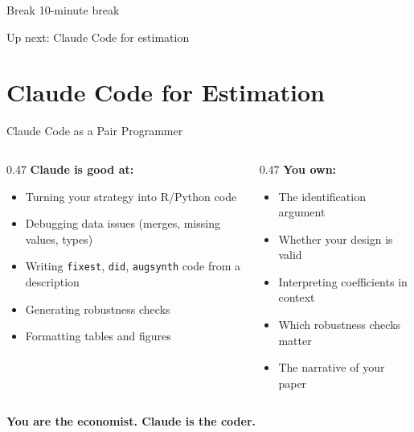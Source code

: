 
\begin{frame}{Break}
  \centering
  \vspace{2cm}
  {\Large 10-minute break}

  \vspace{1cm}

  Up next: Claude Code for estimation
\end{frame}


\section{Claude Code for Estimation}

\begin{frame}{Claude Code as a Pair Programmer}
  \begin{columns}[T]
    \begin{column}{0.47\textwidth}
      \textbf{\textcolor{usfgreen}{Claude is good at:}}
      \begin{itemize}
        \item Turning your strategy into R/Python code
        \item Debugging data issues (merges, missing values, types)
        \item Writing \texttt{fixest}, \texttt{did}, \texttt{augsynth} code from a description
        \item Generating robustness checks
        \item Formatting tables and figures
      \end{itemize}
    \end{column}
    \begin{column}{0.47\textwidth}
      \textbf{You own:}
      \begin{itemize}
        \item The identification argument
        \item Whether your design is valid
        \item Interpreting coefficients in context
        \item Which robustness checks matter
        \item The narrative of your paper
      \end{itemize}
    \end{column}
  \end{columns}

  \vspace{8pt}

  \textbf{You are the economist. Claude is the coder.}
\end{frame}

